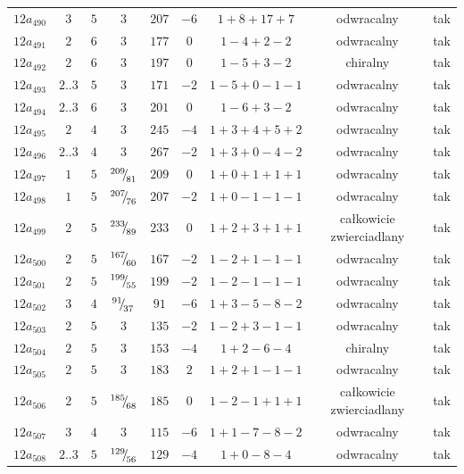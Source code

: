 \begin{longtable}{ccccccccc}
$12a_{490}$ & $3$ & $5$ & $3$ & $207$ & $-6$ & $1+8+17+7$ & odwracalny & tak \\
$12a_{491}$ & $2$ & $6$ & $3$ & $177$ & $0$ & $1-4+2-2$ & odwracalny & tak \\
$12a_{492}$ & $2$ & $6$ & $3$ & $197$ & $0$ & $1-5+3-2$ & chiralny & tak \\
$12a_{493}$ & $2..3$ & $5$ & $3$ & $171$ & $-2$ & $1-5+0-1-1$ & odwracalny & tak \\
$12a_{494}$ & $2..3$ & $6$ & $3$ & $201$ & $0$ & $1-6+3-2$ & odwracalny & tak \\
$12a_{495}$ & $2$ & $4$ & $3$ & $245$ & $-4$ & $1+3+4+5+2$ & odwracalny & tak \\
$12a_{496}$ & $2..3$ & $4$ & $3$ & $267$ & $-2$ & $1+3+0-4-2$ & odwracalny & tak \\
$12a_{497}$ & $1$ & $5$ & ${}^{209}{\mskip -5mu/\mskip -3mu}_{81}$ & $209$ & $0$ & $1+0+1+1+1$ & odwracalny & tak \\
$12a_{498}$ & $1$ & $5$ & ${}^{207}{\mskip -5mu/\mskip -3mu}_{76}$ & $207$ & $-2$ & $1+0-1-1-1$ & odwracalny & tak \\
$12a_{499}$ & $2$ & $5$ & ${}^{233}{\mskip -5mu/\mskip -3mu}_{89}$ & $233$ & $0$ & $1+2+3+1+1$ & całkowicie zwierciadlany & tak \\
$12a_{500}$ & $2$ & $5$ & ${}^{167}{\mskip -5mu/\mskip -3mu}_{60}$ & $167$ & $-2$ & $1-2+1-1-1$ & odwracalny & tak \\
$12a_{501}$ & $2$ & $5$ & ${}^{199}{\mskip -5mu/\mskip -3mu}_{55}$ & $199$ & $-2$ & $1-2-1-1-1$ & odwracalny & tak \\
$12a_{502}$ & $3$ & $4$ & ${}^{91}{\mskip -5mu/\mskip -3mu}_{37}$ & $91$ & $-6$ & $1+3-5-8-2$ & odwracalny & tak \\
$12a_{503}$ & $2$ & $5$ & $3$ & $135$ & $-2$ & $1-2+3-1-1$ & odwracalny & tak \\
$12a_{504}$ & $2$ & $5$ & $3$ & $153$ & $-4$ & $1+2-6-4$ & chiralny & tak \\
$12a_{505}$ & $2$ & $5$ & $3$ & $183$ & $2$ & $1+2+1-1-1$ & odwracalny & tak \\
$12a_{506}$ & $2$ & $5$ & ${}^{185}{\mskip -5mu/\mskip -3mu}_{68}$ & $185$ & $0$ & $1-2-1+1+1$ & całkowicie zwierciadlany & tak \\
$12a_{507}$ & $3$ & $4$ & $3$ & $115$ & $-6$ & $1+1-7-8-2$ & odwracalny & tak \\
$12a_{508}$ & $2..3$ & $5$ & ${}^{129}{\mskip -5mu/\mskip -3mu}_{56}$ & $129$ & $-4$ & $1+0-8-4$ & odwracalny & tak \\

\end{longtable}
